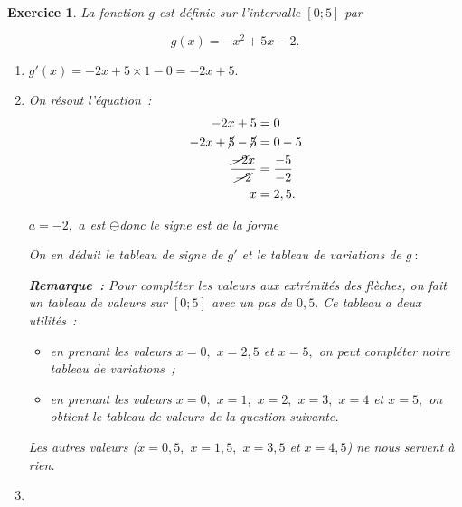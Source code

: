 \documentclass[10pt]{article}
\newtheorem{exo}{Exercice}
\begin{document}
\begin{exo}

La fonction $g$ est définie sur l'intervalle $\left[0;5\right]$ par

\[ g(x) = -x^2+5x-2.\]

\begin{enumerate}
\item $g'(x)=-2x+5\times 1-0=-2x+5.$
\item On résout l'équation~:
\begin{align*}-2x+5&=0\\
 -2x+\cancel{5}-\cancel{5}&=0-5\\
 \frac{\cancel{-2}x}{\cancel{-2}}&=\frac{-5}{-2}\\
 x&=2,5.
 \end{align*}

$a=-2,$ $a$ est \Large $\ominus$\normalsize donc le signe est de la forme \fbox{$+~\upphi~-$}

\medskip


On en déduit le tableau de signe de $g'$ et le tableau de variations de $g~:$


\medskip

\begin{center}
\end{center}

\medskip

\textbf{Remarque~:} Pour compléter les valeurs aux extrémités des flèches, on fait un tableau de valeurs sur $\left[0;5\right]$ avec un pas de $0,5.$ Ce tableau a deux utilités~:

\begin{itemize}
\item[\textbullet] en prenant les valeurs $x=0,$ $x=2,5$ et $x=5,$ on peut compléter notre tableau de variations~;
\item[\textbullet] en prenant les valeurs $x=0,$ $x=1,$ $x=2,$ $x=3,$ $x=4$ et $x=5,$ on obtient le tableau de valeurs de la question suivante.
\end{itemize}

Les autres valeurs ($x=0,5,$ $x=1,5,$ $x=3,5$ et $x=4,5$) ne nous servent à rien.
\item ~{}

\begin{center}


\end{center}
\end{enumerate}
\end{exo}
\end{document}
